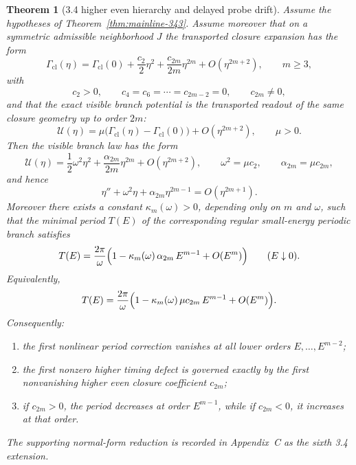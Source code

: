 \documentclass[12pt,a4paper]{article}
\newtheorem{theorem}{Theorem}[section]
\begin{document}
\begin{theorem}[3.4 higher even hierarchy and delayed probe drift]
\label{thm:mainline-345}
Assume the hypotheses of Theorem~\ref{thm:mainline-343}. Assume moreover that on a symmetric admissible neighborhood $J$ the transported closure expansion has the form
\[
 \Gamma_{\mathrm{cl}}(\eta)
 =\Gamma_{\mathrm{cl}}(0)+\frac{c_2}{2}\eta^2+\frac{c_{2m}}{2m}\eta^{2m}+O(\eta^{2m+2}),
 \qquad m\ge 3,
\]
with
\[
 c_2>0,
 \qquad
 c_4=c_6=\cdots=c_{2m-2}=0,
 \qquad
 c_{2m}\neq 0,
\]
and that the exact visible branch potential is the transported readout of the same closure geometry up to order $2m$:
\[
 \mathcal U(\eta)=\mu\bigl(\Gamma_{\mathrm{cl}}(\eta)-\Gamma_{\mathrm{cl}}(0)\bigr)+O(\eta^{2m+2}),
 \qquad \mu>0.
\]
Then the visible branch law has the form
\[
 \mathcal U(\eta)=\frac12\omega^2\eta^2+\frac{\alpha_{2m}}{2m}\eta^{2m}+O(\eta^{2m+2}),
 \qquad
 \omega^2=\mu c_2,
 \qquad
 \alpha_{2m}=\mu c_{2m},
\]
and hence
\[
 \eta''+\omega^2\eta+\alpha_{2m}\eta^{2m-1}=O(\eta^{2m+1}).
\]
Moreover there exists a constant $\kappa_m(\omega)>0$, depending only on $m$ and $\omega$, such that the minimal period $T(E)$ of the corresponding regular small-energy periodic branch satisfies
\[
 T(E)=\frac{2\pi}{\omega}\Bigl(1-\kappa_m(\omega)\,\alpha_{2m}\,E^{m-1}+O(E^m)\Bigr)
 \qquad (E\downarrow 0).
\]
Equivalently,
\[
 T(E)=\frac{2\pi}{\omega}\Bigl(1-\kappa_m(\omega)\,\mu c_{2m}\,E^{m-1}+O(E^m)\Bigr).
\]
Consequently:
\begin{enumerate}[label=(\roman*)]
 \item the first nonlinear period correction vanishes at all lower orders $E,\dots,E^{m-2}$;
 \item the first nonzero higher timing defect is governed exactly by the first nonvanishing higher even closure coefficient $c_{2m}$;
 \item if $c_{2m}>0$, the period decreases at order $E^{m-1}$, while if $c_{2m}<0$, it increases at that order.
\end{enumerate}
The supporting normal-form reduction is recorded in Appendix~C as the sixth 3.4 extension.
\end{theorem}
\end{document}

